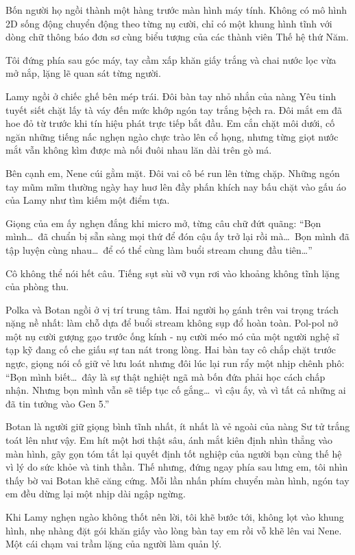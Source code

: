 \documentclass[../main.tex]{subfiles}
\begin{document}
Bốn người họ ngồi thành một hàng trước màn hình máy tính. Không có mô hình 2D sống động chuyển động theo từng nụ cười, chỉ có một khung hình tĩnh với dòng chữ thông báo đơn sơ cùng biểu tượng của các thành viên Thế hệ thứ Năm.

Tôi đứng phía sau góc máy, tay cầm xấp khăn giấy trắng và chai nước lọc vừa mở nắp, lặng lẽ quan sát từng người.

Lamy ngồi ở chiếc ghế bên mép trái. Đôi bàn tay nhỏ nhắn của nàng Yêu tinh tuyết siết chặt lấy tà váy đến mức khớp ngón tay trắng bệch ra. Đôi mắt em đã hoe đỏ từ trước khi tín hiệu phát trực tiếp bắt đầu. Em cắn chặt môi dưới, cố ngăn những tiếng nấc nghẹn ngào chực trào lên cổ họng, nhưng từng giọt nước mắt vẫn không kìm được mà nối đuôi nhau lăn dài trên gò má.

Bên cạnh em, Nene cúi gằm mặt. Đôi vai cô bé run lên từng chặp. Những ngón tay mũm mĩm thường ngày hay huơ lên đầy phấn khích nay bấu chặt vào gấu áo của Lamy như tìm kiếm một điểm tựa.

Giọng của em ấy nghẹn đắng khi micro mở, từng câu chữ đứt quãng: ``Bọn mình\dots\ đã chuẩn bị sẵn sàng mọi thứ để đón cậu ấy trở lại rồi mà\dots\ Bọn mình đã tập luyện cùng nhau\dots\ để có thể cùng làm buổi stream chung đầu tiên\dots''

Cô không thể nói hết câu. Tiếng sụt sùi vỡ vụn rơi vào khoảng không tĩnh lặng của phòng thu.

Polka và Botan ngồi ở vị trí trung tâm. Hai người họ gánh trên vai trọng trách nặng nề nhất: làm chỗ dựa để buổi stream không sụp đổ hoàn toàn. Pol-pol nở một nụ cười gượng gạo trước ống kính - nụ cười méo mó của một người nghệ sĩ tạp kỹ đang cố che giấu sự tan nát trong lòng. Hai bàn tay cô chắp chặt trước ngực, giọng nói cố giữ vẻ lưu loát nhưng đôi lúc lại run rẩy một nhịp chênh phô: ``Bọn mình biết\dots\ đây là sự thật nghiệt ngã mà bốn đứa phải học cách chấp nhận. Nhưng bọn mình vẫn sẽ tiếp tục cố gắng\dots\ vì cậu ấy, và vì tất cả những ai đã tin tưởng vào Gen 5.''

Botan là người giữ giọng bình tĩnh nhất, ít nhất là vẻ ngoài của nàng Sư tử trắng toát lên như vậy. Em hít một hơi thật sâu, ánh mắt kiên định nhìn thẳng vào màn hình, gãy gọn tóm tắt lại quyết định tốt nghiệp của người bạn cùng thế hệ vì lý do sức khỏe và tinh thần. Thế nhưng, đứng ngay phía sau lưng em, tôi nhìn thấy bờ vai Botan khẽ căng cứng. Mỗi lần nhấn phím chuyển màn hình, ngón tay em đều dừng lại một nhịp dài ngập ngừng.

Khi Lamy nghẹn ngào không thốt nên lời, tôi khẽ bước tới, không lọt vào khung hình, nhẹ nhàng đặt gói khăn giấy vào lòng bàn tay em rồi vỗ khẽ lên vai Nene. Một cái chạm vai trầm lặng của người làm quản lý.
\end{document}
